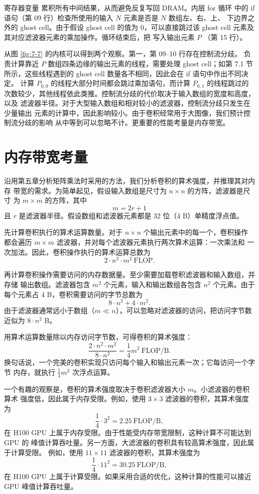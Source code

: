 寄存器变量  累积所有中间结果，从而避免反复写回 DRAM。内层 for 循环
中的 if 语句（第 09 行）检查所使用的输入 $N$ 元素是否是 $N$ 数组左、右、上、
下边界之外的 ghost cell。由于假设 ghost cell 的值为 0，可以直接跳过该 ghost cell
元素及其对应滤波器元素的乘加操作。循环结束后，把  写入输出元素 $P$
（第 15 行）。

从图 \ref{fig:7-7} 的内核可以得到两个观察。第一，第 09–10 行存在控制流分歧。
负责计算靠近 $P$ 数组四条边缘的输出元素的线程，需要处理 ghost cell；如第 7.1 节
所示，这些线程遇到的 ghost cell 数量各不相同，因此会在 if 语句中作出不同决定。
计算 $P_{0,0}$ 的线程大部分时间都会跳过乘加语句，而计算 $P_{0,1}$ 的线程跳过的
次数较少，其他线程依此类推。控制流分歧的代价取决于输入数组的宽度和高度，以及
滤波器半径。对于大型输入数组和相对较小的滤波器，控制流分歧只发生在少量输出
元素的计算中，因此影响较小。由于卷积经常用于大图像，我们预计控制流分歧的影响
从中等到可以忽略不计。更重要的性能考量是内存带宽。

\section{内存带宽考量}
\label{sec:convolution-memory-bandwidth}

沿用第五章分析矩阵乘法时采用的方法，我们分析卷积的算术强度，并推理其对内存
带宽的需求。为简单起见，假设输入数组是尺寸为 $n\times n$ 的方阵，滤波器是尺寸
为 $m\times m$ 的方阵，其中
\[
  m=2r+1
\]
且 $r$ 是滤波器半径。假设数组和滤波器元素都是 32 位（4 B）单精度浮点值。

先计算卷积执行的算术运算数量。对于 $n\times n$ 个输出元素中的每一个，卷积操作
都会遍历 $m\times m$ 滤波器，并对每个滤波器元素执行两次算术运算：一次乘法和
一次加法。因此，卷积操作执行的算术运算总数为
\[
  2\cdot n^2\cdot m^2\ \mathrm{FLOP}.
\]

再计算卷积操作需要访问的内存数据量。至少需要加载卷积滤波器和输入数组，并存储
输出数组。滤波器包含 $m^2$ 个元素，输入和输出数组各包含 $n^2$ 个元素。由于
每个元素占 4 B，卷积需要访问的字节总数为
\[
  8\cdot n^2+4\cdot m^2.
\]
由于滤波器通常远小于数组（$m\ll n$），可以忽略对滤波器的访问，把访问字节数
近似为 $8\cdot n^2$ B。

用算术运算数量除以内存访问字节数，可得卷积的算术强度：
\[
  \frac{2\cdot n^2\cdot m^2}{8\cdot n^2}
  =\frac{1}{4}m^2\ \mathrm{FLOP/B}.
\]
换句话说，一个完美的卷积实现只访问每个输入和输出元素一次；它每访问一个字节
内存，就执行 $\frac14m^2$ 次浮点运算。

一个有趣的观察是，卷积的算术强度取决于卷积滤波器大小 $m$。小滤波器的卷积算术
强度低，因此属于内存受限。例如，使用 $3\times3$ 滤波器的卷积，其算术强度为
\[
  \frac14\cdot3^2=2.25\ \mathrm{FLOP/B},
\]
在 H100 GPU 上属于内存受限。由于性能受内存带宽限制，这种计算不可能达到 GPU 的
峰值计算吞吐量。另一方面，大滤波器的卷积具有较高算术强度，因此属于计算受限。
例如，使用 $11\times11$ 滤波器的卷积，其算术强度为
\[
  \frac14\cdot11^2=30.25\ \mathrm{FLOP/B},
\]
在 H100 GPU 上属于计算受限。如果采用合适的优化，这种计算的性能可以接近 GPU
峰值计算吞吐量。

